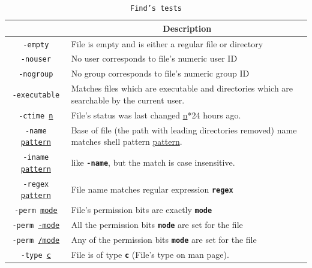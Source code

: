 \begin{table}[H]
\centering
\begin{tabular}[H]{cp{13cm}}
\hline
\rowcolor[HTML]{C0C0C0} 
\multicolumn{1}{c|}{\cellcolor[HTML]{C0C0C0}\textbf{Test}} &
\multicolumn{1}{c}{\cellcolor[HTML]{C0C0C0}\textbf{Description}} \\ \hline
\texttt{-empty}	& File is empty and is either a regular file or directory\\ \hline
\texttt{-nouser}	& No user corresponds to file's numeric user ID\\ \hline
\texttt{-nogroup}	& No group corresponds to file's numeric group ID\\ \hline
\texttt{-executable}	& Matches files which are executable and directories which are searchable by the current user.\\ \hline
\texttt{-ctime \underline{n}}	& File's status was last changed \underline{n}*24 hours ago.\\ \hline
\texttt{-name \underline{pattern}}	& Base of file (the path with leading directories removed) name matches shell pattern \underline{pattern}.\\ \hline
\texttt{-iname \underline{pattern}}	& like \texttt{\textbf{-name}}, but the match is case insensitive.\\ \hline
\texttt{-regex \underline{pattern}}	& File name matches regular expression \texttt{\textbf{regex}}\\ \hline
\texttt{-perm \underline{mode}}	& File's permission bits are exactly \texttt{\textbf{mode}}\\ \hline
\texttt{-perm \underline{-mode}}	& All the permission bits \texttt{\textbf{mode}} are set for the file\\ \hline
\texttt{-perm \underline{/mode}}	& Any of the permission bits \texttt{\textbf{mode}} are set for the file\\ \hline
\texttt{-type \underline{c}}	& File is of type \texttt{\textbf{c}} (File's type on man page).\\ \hline
\end{tabular}
\caption{\texttt{Find's tests}}\label{findcmdtests}
\end{table}

